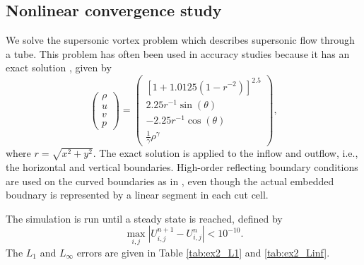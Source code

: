 \subsection{Nonlinear convergence study}
We solve the supersonic vortex problem which describes supersonic flow 
through a tube.  This problem has often been used in accuracy studies
because it has an exact solution \cite{aftosmis:acc}, given by 
$$
\begin{pmatrix}
\rho\\
u \\
v \\
p
\end{pmatrix} = \begin{pmatrix}
[1 + 1.0125(1-r^{-2})]^{2.5}\\
2.25r^{-1}\sin(\theta)\\
-2.25r^{-1}\cos(\theta)\\
\frac{1}{\gamma}\rho^{\gamma}
\end{pmatrix},
$$
where $r = \sqrt{x^2+y^2}$.  The exact solution is applied to the inflow 
and outflow, i.e., the horizontal and vertical boundaries.  
High-order reflecting boundary conditions are used on the curved
boundaries as in \cite{}, even though  the  actual embedded boudnary is
represented by a linear segment in each cut cell.  

The simulation is run until a steady state is reached, defined by 
$$
\max_{i,j}|U^{n+1}_{i,j}-U^{n}_{i,j}| < 10^{-10}.
$$
The $L_1$ and $L_\infty$ errors are given in Table \ref{tab:ex2_L1} and \ref{tab:ex2_Linf}.

